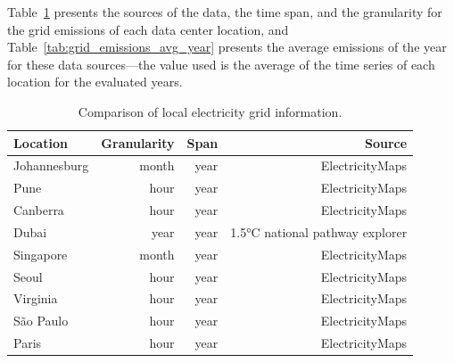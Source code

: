 Table~\ref{tab:grid_emissions_hist} presents the sources of the data, the time span, and the granularity for the grid emissions of each data center location, and Table~\ref{tab:grid_emissions_avg_year} presents the average  emissions of the year for these data sources---the value used is the average of the time series of each location for the evaluated years.

\begin{table}[h]  
\caption{Comparison of local electricity grid information. }\label{tab:grid_emissions_hist} \centering  
  \begin{tabular}{|l|r|r|r|}
    \hline
    
  \textbf{Location} &   \textbf{Granularity} & \textbf{Span} & \textbf{Source} \\
  \hline
  Johannesburg & month & year & ElectricityMaps  \\
  \hline
  Pune  & hour & year & ElectricityMaps  \\
  \hline
  Canberra  & hour &  year & ElectricityMaps \\
  \hline
  Dubai    & year & year & 1.5°C national pathway explorer  \\                       
  \hline
  Singapore & month & year & ElectricityMaps \\
  \hline     
  Seoul     & hour & year & ElectricityMaps \\
  \hline
  Virginia  &  hour & year & ElectricityMaps \\
  \hline
  São Paulo & hour & year  & ElectricityMaps \\
  \hline 
  Paris     & hour & year  & ElectricityMaps  \\
  \hline
\end{tabular}  
\end{table}


